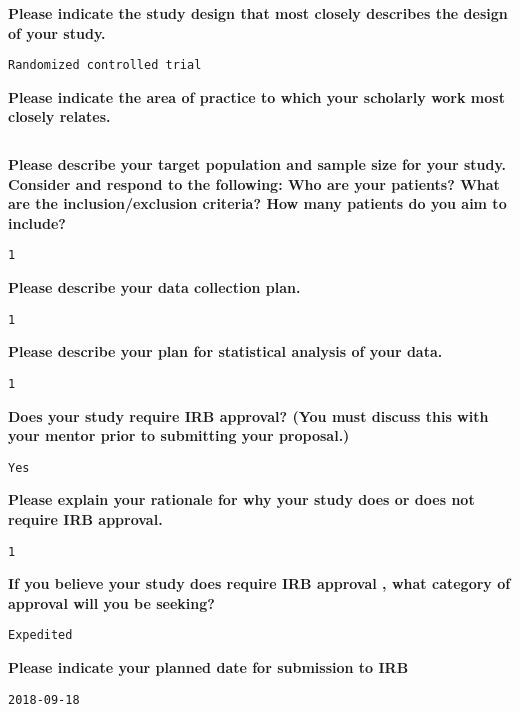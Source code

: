 \documentclass[11pt]{article}
\begin{document}
{\bfseries Please indicate the study design that most closely describes the design of your study.}
\begin{lstlisting}[mathescape]
Randomized controlled trial
\end{lstlisting}
\hfill

{\bfseries Please indicate the area of practice to which your scholarly work most closely relates.}
\begin{lstlisting}[mathescape]

\end{lstlisting}
\hfill

{\bfseries Please describe your target population and sample size for your study. Consider and respond to the following: Who are your patients? What are the inclusion/exclusion criteria? How many patients do you aim to include?}
\begin{lstlisting}[mathescape]
1
\end{lstlisting}
\hfill

{\bfseries Please describe your data collection plan.}
\begin{lstlisting}[mathescape]
1
\end{lstlisting}
\hfill

{\bfseries Please describe your plan for statistical analysis of your data.}
\begin{lstlisting}[mathescape]
1
\end{lstlisting}
\hfill

{\bfseries Does your study require IRB approval? (You must discuss this with your mentor prior to submitting your proposal.)}
\begin{lstlisting}[mathescape]
Yes
\end{lstlisting}
\hfill

{\bfseries Please explain your rationale for why your study does or does not require IRB approval.}
\begin{lstlisting}[mathescape]
1
\end{lstlisting}
\hfill

{\bfseries If you believe your study does require IRB approval , what category of approval will you be seeking?}
\begin{lstlisting}[mathescape]
Expedited
\end{lstlisting}
\hfill

{\bfseries Please indicate your planned date for submission to IRB}
\begin{lstlisting}[mathescape]
2018-09-18
\end{lstlisting}
\hfill
\end{document}
